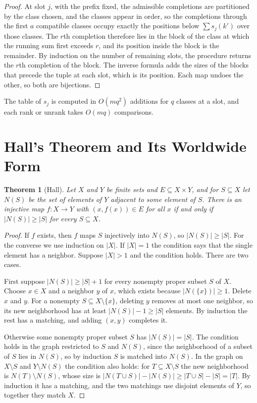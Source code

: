 \documentclass[11pt,twoside,openright]{book}
\theoremstyle{plain}
\newtheorem{theorem}{Theorem}[chapter]
\theoremstyle{definition}
\theoremstyle{remark}
\begin{document}
\begin{proof}
At slot $j$, with the prefix fixed, the admissible completions are partitioned by the class chosen, and the classes appear in order, so the completions through the first $a$ compatible classes occupy exactly the positions below $\sum s_j(k')$ over those classes. The $r$th completion therefore lies in the block of the class at which the running sum first exceeds $r$, and its position inside the block is the remainder. By induction on the number of remaining slots, the procedure returns the $r$th completion of the block. The inverse formula adds the sizes of the blocks that precede the tuple at each slot, which is its position. Each map undoes the other, so both are bijections.
\end{proof}

The table of $s_j$ is computed in $O(m q^2)$ additions for $q$ classes at a slot, and each rank or unrank takes $O(mq)$ comparisons.

\section{Hall's Theorem and Its Worldwide Form}\label{sec:hallapp}

\begin{theorem}[Hall]\label{thm:hallapp}
Let $X$ and $Y$ be finite sets and $E\subseteq X\times Y$, and for $S\subseteq X$ let $N(S)$ be the set of elements of $Y$ adjacent to some element of $S$. There is an injective map $f:X\to Y$ with $(x,f(x))\in E$ for all $x$ if and only if $\lvert N(S)\rvert\ge\lvert S\rvert$ for every $S\subseteq X$.
\end{theorem}

\begin{proof}
If $f$ exists, then $f$ maps $S$ injectively into $N(S)$, so $\lvert N(S)\rvert\ge\lvert S\rvert$. For the converse we use induction on $\lvert X\rvert$. If $\lvert X\rvert=1$ the condition says that the single element has a neighbor. Suppose $\lvert X\rvert>1$ and the condition holds. There are two cases.

First suppose $\lvert N(S)\rvert\ge\lvert S\rvert+1$ for every nonempty proper subset $S$ of $X$. Choose $x\in X$ and a neighbor $y$ of $x$, which exists because $\lvert N(\{x\})\rvert\ge1$. Delete $x$ and $y$. For a nonempty $S\subseteq X\setminus\{x\}$, deleting $y$ removes at most one neighbor, so its new neighborhood has at least $\lvert N(S)\rvert-1\ge\lvert S\rvert$ elements. By induction the rest has a matching, and adding $(x,y)$ completes it.

Otherwise some nonempty proper subset $S$ has $\lvert N(S)\rvert=\lvert S\rvert$. The condition holds in the graph restricted to $S$ and $N(S)$, since the neighborhood of a subset of $S$ lies in $N(S)$, so by induction $S$ is matched into $N(S)$. In the graph on $X\setminus S$ and $Y\setminus N(S)$ the condition also holds: for $T\subseteq X\setminus S$ the new neighborhood is $N(T)\setminus N(S)$, whose size is $\lvert N(T\cup S)\rvert-\lvert N(S)\rvert\ge\lvert T\cup S\rvert-\lvert S\rvert=\lvert T\rvert$. By induction it has a matching, and the two matchings use disjoint elements of $Y$, so together they match $X$.
\end{proof}
\end{document}
